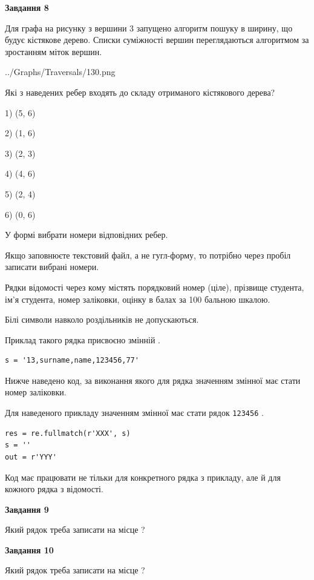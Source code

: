 \documentclass[12pt, ukrainian]{article}
\def\code#1{\Verb!#1!}
\begin{document}
{\begin {large}
{\begin {center}\textbf{Завдання 8}\end {center}}\par
Для графа на рисунку з вершини 3 запущено алгоритм пошуку в ширину, що будує кістякове дерево. Списки суміжності вершин переглядаються алгоритмом за зростанням міток вершин.\par
\begin{center}
	{../Graphs/Traversals/130.png}
\end{center}
\par Які з наведених ребер входять до складу отриманого кістякового дерева?\par
1) (5, 6)\par
2) (1, 6)\par
3) (2, 3)\par
4) (4, 6)\par
5) (2, 4)\par
6) (0, 6)\par
{\vskip 15pt} У формі вибрати номери відповідних ребер.


Якщо заповнюєте текстовий файл, а не гугл-форму, то потрібно через пробіл записа\-ти вибрані номери.\par
\newpage


Рядки відомості через кому містять порядковий номер (ціле), пріз\-ви\-ще студен\-та, ім'я студента, номер заліковки, оцінку в балах за 100 бальною шкалою.

Білі символи навколо роздільників не допускаються.

Приклад такого рядка присвоєно змінній .



\begin{verbatim}
s = '13,surname,name,123456,77'
\end{verbatim}


Нижче наведено код, за виконання якого для рядка  значенням змінної  має стати номер заліковки.

Для наведеного прикладу значенням змінної  має стати рядок \code{123456} .



\begin{verbatim}
res = re.fullmatch(r'XXX', s)
s = ''
out = r'YYY'
\end{verbatim}


Код має працювати не тільки для конкретного рядка з прикладу, але й для кожного рядка з відомості.

{\begin {center}\textbf{Завдання 9}\end {center}}\par
Який рядок треба записати на місце  ?\par
\vspace{5mm}


{\begin {center}\textbf{Завдання 10}\end {center}}\par
Який рядок треба записати на місце  ?\par


\newpage


\end {large}}
\end{document}
